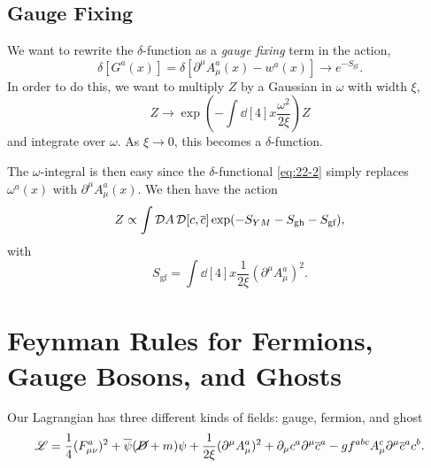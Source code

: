 \subsection{Gauge Fixing}%
\label{sub:gauge_fixing}

We want to rewrite the $\delta$-function as a \emph{gauge fixing} term in the action,
\begin{equation}
  \label{eq:22-2}
  \delta[G^{a}(x)] = \delta[\partial^{\mu} A_{\mu}^{a}(x) - w^{a}(x)] \to e^{-S_{\text{gf}}}.
\end{equation}
In order to do this, we want to multiply $Z$ by a Gaussian in $\omega$ with width $\xi$,
\begin{equation}
  Z \to \exp(-\int \dd[4]{x} \frac{\omega^2}{2 \xi}) Z
\end{equation}
and integrate over $\omega$. As $\xi \to 0$, this becomes a $\delta$-function.

The $\omega$-integral is then easy since the $\delta$-functional \eqref{eq:22-2} simply replaces $\omega^{a}(x)$ with $\partial^{\mu} A_{\mu}^{a}(x)$.
We then have the action
\begin{equation}
  Z \propto \int \mathop{\mathcal{D} A} \mathop{\mathcal{D} [c, \overline{c}{}]} \exp(-S_{YM} - S_{\text{gh}} - S_{\text{gf}}),
\end{equation}
with
\begin{equation}
  \label{eq:22-gf}
  S_{\text{gf}} = \int \dd[4]{x} \frac{1}{2 \xi} (\partial^{\mu} A_{\mu}^{a})^2.
\end{equation}

\section{Feynman Rules for Fermions, Gauge Bosons, and Ghosts}%
\label{sec:feynman_rules_for_fermions_and_gauge_bosons_and_ghosts}

Our Lagrangian has three different kinds of fields: gauge, fermion, and ghost
\begin{equation}
  \label{eq:l-nonab}
  \mathscr{L} = \frac{1}{4} (F^{a}_{\mu\nu})^2 + \overline{\psi}{} (\cancel{D} + m) \psi + \frac{1}{2 \xi} (\partial^{\mu} A_{\mu}^{a}) ^2 + \partial_{\mu} c^{a} \partial^{\mu} \overline{c}{}^{a} - g f^{abc} A_{\mu}^{c} \partial^{\mu} \overline{c}{}^{a} c^{b}.
\end{equation}

